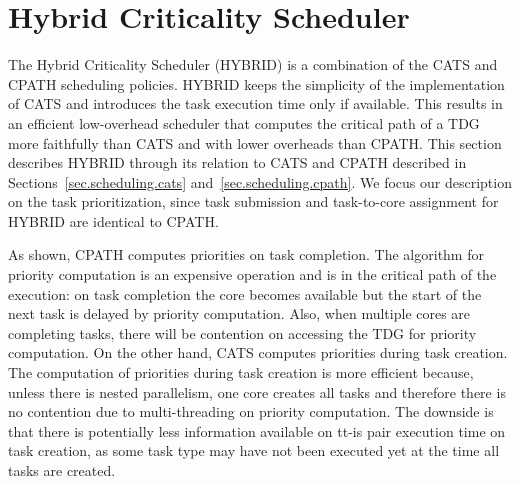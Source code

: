 \section{Hybrid Criticality Scheduler}
\label{sec.scheduling.hybrid}

The Hybrid Criticality Scheduler (HYBRID) is a combination of the CATS and CPATH scheduling policies.
HYBRID keeps the simplicity of the implementation of CATS and introduces the task execution time only if available.
This results in an efficient low-overhead scheduler that computes the critical path of a TDG more faithfully than CATS and with lower overheads than CPATH.
This section describes HYBRID through its relation to CATS and CPATH described in Sections~\ref{sec.scheduling.cats} and~\ref{sec.scheduling.cpath}. 
We focus our description on the task prioritization, since task submission and task-to-core assignment for HYBRID are identical to CPATH.

As shown, CPATH computes priorities on task completion. 
The algorithm for priority computation is an expensive operation and is in the critical path of the execution:
on task completion the core becomes available but the start of the next task is delayed by priority computation.
Also, when multiple cores are completing tasks, there will be contention on accessing the TDG for priority computation.
On the other hand, CATS computes priorities during task creation.
The computation of priorities during task creation is more efficient because, unless there is nested parallelism, one core creates all tasks and therefore there is no contention due to multi-threading on priority computation. 
The downside is that there is potentially less information available on tt-is pair execution time on task creation, as some task type may have not been executed yet at the time all tasks are created.


